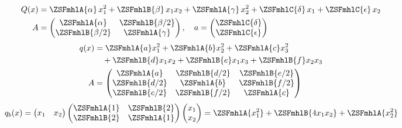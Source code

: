 \begin{formulabox}
  \[
  \begin{aligned}
    Q(x) &= \ZSFmhlA{\alpha}\, x_1^2 + \ZSFmhlB{\beta}\, x_1 x_2 + \ZSFmhlA{\gamma}\, x_2^2 + \ZSFmhlC{\delta}\, x_1 + \ZSFmhlC{\epsilon}\, x_2 \\
    A &= \begin{pmatrix} \ZSFmhlA{\alpha} & \ZSFmhlB{\beta/2} \\ \ZSFmhlB{\beta/2} & \ZSFmhlA{\gamma} \end{pmatrix}, \quad a = \begin{pmatrix} \ZSFmhlC{\delta} \\ \ZSFmhlC{\epsilon} \end{pmatrix}
  \end{aligned}
  \]
  \ZSFsep
  \[
  \begin{aligned}
    q(x) &= \ZSFmhlA{a} x_1^2 + \ZSFmhlA{b} x_2^2 + \ZSFmhlA{c} x_3^2 \\
         &\quad + \ZSFmhlB{d} x_1 x_2 + \ZSFmhlB{e} x_1 x_3 + \ZSFmhlB{f} x_2 x_3 \\
    A &= \begin{pmatrix} \ZSFmhlA{a} & \ZSFmhlB{d/2} & \ZSFmhlB{e/2} \\ \ZSFmhlB{d/2} & \ZSFmhlA{b} & \ZSFmhlB{f/2} \\ \ZSFmhlB{e/2} & \ZSFmhlB{f/2} & \ZSFmhlA{c} \end{pmatrix}
  \end{aligned}
  \]
  \ZSFsep
  \[
  q_b(x) = \begin{pmatrix} x_1 & x_2 \end{pmatrix} \begin{pmatrix} \ZSFmhlA{1} & \ZSFmhlB{2} \\ \ZSFmhlB{2} & \ZSFmhlA{1} \end{pmatrix} \begin{pmatrix} x_1 \\ x_2 \end{pmatrix} = \ZSFmhlA{x_1^2} + \ZSFmhlB{4x_1x_2} + \ZSFmhlA{x_2^2}
  \]
  \ZSFsep
  \[
  \begin{aligned}

\end{aligned}\]
\end{formulabox}
